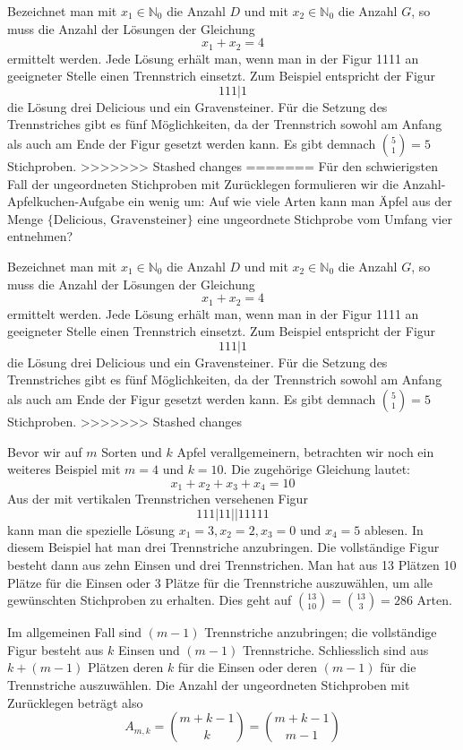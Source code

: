 \documentclass[%
<<<<<<< Updated upstream
<<<<<<< Updated upstream
11pt,%
twoside,%
titlepage,%
german,%
=======
=======
>>>>>>> Stashed changes
11pt,%
twoside,%
titlepage,%
swissgerman,%
<<<<<<< Updated upstream
>>>>>>> Stashed changes
=======
>>>>>>> Stashed changes
headsepline%
]{scrartcl}
\theoremstyle{definition}
\theoremstyle{plain}
\begin{document}
Bezeichnet man mit $x_1\in\mathbb{N}_0$ die Anzahl $D$ und mit $x_2\in\mathbb{N}_0$ die Anzahl $G$, so muss die Anzahl der Lösungen der Gleichung $$x_1+x_2=4$$ ermittelt werden. Jede Lösung erhält man, wenn man in der Figur 1111 an geeigneter Stelle einen Trennstrich einsetzt. Zum Beispiel entspricht der Figur $$111|1$$ die Lösung drei Delicious und ein Gravensteiner. Für die Setzung des Trennstriches gibt es fünf Möglichkeiten, da der Trennstrich sowohl am Anfang als auch am Ende der Figur gesetzt werden kann. Es gibt demnach $\binom{5}{1}=5$ Stichproben.
>>>>>>> Stashed changes
=======
Für den schwierigsten Fall der ungeordneten Stichproben mit Zurücklegen formulieren wir die Anzahl-Apfelkuchen-Aufgabe ein wenig um: Auf wie viele Arten kann man \"Apfel aus der Menge $\{\text{Delicious, Gravensteiner}\}$ eine ungeordnete Stichprobe vom Umfang vier entnehmen?

Bezeichnet man mit $x_1\in\mathbb{N}_0$ die Anzahl $D$ und mit $x_2\in\mathbb{N}_0$ die Anzahl $G$, so muss die Anzahl der Lösungen der Gleichung $$x_1+x_2=4$$ ermittelt werden. Jede Lösung erhält man, wenn man in der Figur 1111 an geeigneter Stelle einen Trennstrich einsetzt. Zum Beispiel entspricht der Figur $$111|1$$ die Lösung drei Delicious und ein Gravensteiner. Für die Setzung des Trennstriches gibt es fünf Möglichkeiten, da der Trennstrich sowohl am Anfang als auch am Ende der Figur gesetzt werden kann. Es gibt demnach $\binom{5}{1}=5$ Stichproben.
>>>>>>> Stashed changes

Bevor wir auf $m$ Sorten und $k$ Apfel verallgemeinern, betrachten wir noch ein weiteres Beispiel mit $m=4$ und $k=10$. Die zugehörige Gleichung lautet: $$x_1+x_2+x_3+x_4=10$$ Aus der mit vertikalen Trennstrichen versehenen Figur $$111|11||11111$$ kann man die spezielle Lösung $x_1 = 3, x_2 = 2, x_3 = 0$ und $x_4 = 5$ ablesen. In diesem Beispiel hat man drei Trennstriche anzubringen. Die vollständige Figur besteht dann aus zehn Einsen und drei Trennstrichen. Man hat aus 13 Plätzen 10 Plätze für die Einsen oder 3 Plätze für die Trennstriche
auszuwählen, um alle gewünschten Stichproben zu erhalten. Dies geht auf $\binom{13}{10}=\binom{13}{3}=286$ Arten.

Im allgemeinen Fall sind $(m-1)$ Trennstriche anzubringen; die vollständige Figur besteht aus $k$ Einsen und $(m-1)$ Trennstriche. Schliesslich sind aus $k+(m-1)$ Plätzen deren $k$ für die Einsen oder deren $(m-1)$ für die Trennstriche auszuwählen.
Die Anzahl der ungeordneten Stichproben mit Zurücklegen beträgt also
$$A_{m,k}=\binom{m+k-1}{k}=\binom{m+k-1}{m-1}$$
\end{document}
